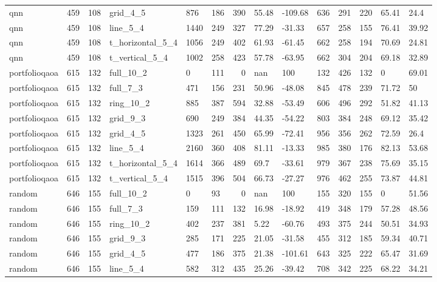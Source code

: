 \begin{longtable}{lrrlllrllllrll}
qnn & 459 & 108 & grid\_4\_5 & 876 & 186 & 390 & 55.48 & -109.68 & 636 & 291 & 220 & 65.41 & 24.4 \\
qnn & 459 & 108 & line\_5\_4 & 1440 & 249 & 327 & 77.29 & -31.33 & 657 & 258 & 155 & 76.41 & 39.92 \\
qnn & 459 & 108 & t\_horizontal\_5\_4 & 1056 & 249 & 402 & 61.93 & -61.45 & 662 & 258 & 194 & 70.69 & 24.81 \\
qnn & 459 & 108 & t\_vertical\_5\_4 & 1002 & 258 & 423 & 57.78 & -63.95 & 662 & 304 & 204 & 69.18 & 32.89 \\
portfolioqaoa & 615 & 132 & full\_10\_2 & 0 & 111 & 0 & nan & 100 & 132 & 426 & 132 & 0 & 69.01 \\
portfolioqaoa & 615 & 132 & full\_7\_3 & 471 & 156 & 231 & 50.96 & -48.08 & 845 & 478 & 239 & 71.72 & 50 \\
portfolioqaoa & 615 & 132 & ring\_10\_2 & 885 & 387 & 594 & 32.88 & -53.49 & 606 & 496 & 292 & 51.82 & 41.13 \\
portfolioqaoa & 615 & 132 & grid\_9\_3 & 690 & 249 & 384 & 44.35 & -54.22 & 803 & 384 & 248 & 69.12 & 35.42 \\
portfolioqaoa & 615 & 132 & grid\_4\_5 & 1323 & 261 & 450 & 65.99 & -72.41 & 956 & 356 & 262 & 72.59 & 26.4 \\
portfolioqaoa & 615 & 132 & line\_5\_4 & 2160 & 360 & 408 & 81.11 & -13.33 & 985 & 380 & 176 & 82.13 & 53.68 \\
portfolioqaoa & 615 & 132 & t\_horizontal\_5\_4 & 1614 & 366 & 489 & 69.7 & -33.61 & 979 & 367 & 238 & 75.69 & 35.15 \\
portfolioqaoa & 615 & 132 & t\_vertical\_5\_4 & 1515 & 396 & 504 & 66.73 & -27.27 & 976 & 462 & 255 & 73.87 & 44.81 \\
random & 646 & 155 & full\_10\_2 & 0 & 93 & 0 & nan & 100 & 155 & 320 & 155 & 0 & 51.56 \\
random & 646 & 155 & full\_7\_3 & 159 & 111 & 132 & 16.98 & -18.92 & 419 & 348 & 179 & 57.28 & 48.56 \\
random & 646 & 155 & ring\_10\_2 & 402 & 237 & 381 & 5.22 & -60.76 & 493 & 375 & 244 & 50.51 & 34.93 \\
random & 646 & 155 & grid\_9\_3 & 285 & 171 & 225 & 21.05 & -31.58 & 455 & 312 & 185 & 59.34 & 40.71 \\
random & 646 & 155 & grid\_4\_5 & 477 & 186 & 375 & 21.38 & -101.61 & 643 & 325 & 222 & 65.47 & 31.69 \\
random & 646 & 155 & line\_5\_4 & 582 & 312 & 435 & 25.26 & -39.42 & 708 & 342 & 225 & 68.22 & 34.21 \\

\end{longtable}
